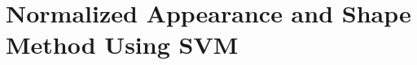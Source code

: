 \documentclass[Main]{subfiles}
\begin{document}
\section{Normalized Appearance and Shape Method Using SVM} %
	\label{sec:normalized_appearance_and_shape_method_using_svm}




\end{document}
